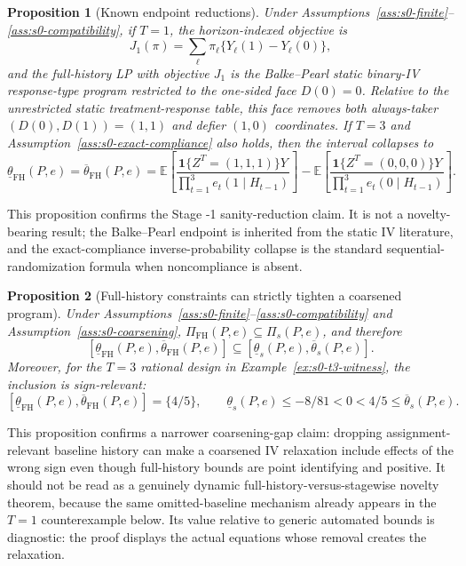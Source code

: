 \documentclass[11pt]{article}
\newcommand{\E}{\mathbb{E}}
\newcommand{\one}{\mathbf{1}}
\theoremstyle{definition}
\theoremstyle{plain}
\newtheorem{proposition}{Proposition}
\theoremstyle{remark}
\begin{document}
\begin{proposition}[Known endpoint reductions]\label{prop:s0-reductions}
Under Assumptions~\ref{ass:s0-finite}--\ref{ass:s0-compatibility}, if \(T=1\), the horizon-indexed objective is
\[
J_1(\pi)=\sum_{\ell}\pi_\ell\{Y_\ell(1)-Y_\ell(0)\},
\]
and the full-history LP with objective \(J_1\) is the Balke--Pearl static binary-IV response-type program restricted to the one-sided face \(D(0)=0\).  Relative to the unrestricted static treatment-response table, this face removes both always-taker \((D(0),D(1))=(1,1)\) and defier \((1,0)\) coordinates.  If \(T=3\) and Assumption~\ref{ass:s0-exact-compliance} also holds, then the interval collapses to
\[
\underline\theta_{\mathrm{FH}}(P,e)
=\overline\theta_{\mathrm{FH}}(P,e)
=
\E\left[
\frac{\one\{Z^T=(1,1,1)\}Y}
{\prod_{t=1}^3 e_t(1\mid H_{t-1})}
\right]
-
\E\left[
\frac{\one\{Z^T=(0,0,0)\}Y}
{\prod_{t=1}^3 e_t(0\mid H_{t-1})}
\right].
\]
\end{proposition}

This proposition confirms the Stage -1 sanity-reduction claim.  It is not a novelty-bearing result; the Balke--Pearl endpoint is inherited from the static IV literature, and the exact-compliance inverse-probability collapse is the standard sequential-randomization formula when noncompliance is absent.

\begin{proposition}[Full-history constraints can strictly tighten a coarsened program]\label{prop:s0-strict-witness}
Under Assumptions~\ref{ass:s0-finite}--\ref{ass:s0-compatibility} and Assumption~\ref{ass:s0-coarsening}, \(\Pi_{\mathrm{FH}}(P,e)\subseteq\Pi_s(P,e)\), and therefore
\[
[\underline\theta_{\mathrm{FH}}(P,e),\overline\theta_{\mathrm{FH}}(P,e)]
\subseteq
[\underline\theta_s(P,e),\overline\theta_s(P,e)].
\]
Moreover, for the \(T=3\) rational design in Example~\ref{ex:s0-t3-witness}, the inclusion is sign-relevant:
\[
[\underline\theta_{\mathrm{FH}}(P,e),\overline\theta_{\mathrm{FH}}(P,e)]
=\{4/5\},
\qquad
\underline\theta_s(P,e)\le -8/81<0<4/5\le\overline\theta_s(P,e).
\]
\end{proposition}

This proposition confirms a narrower coarsening-gap claim: dropping assignment-relevant baseline history can make a coarsened IV relaxation include effects of the wrong sign even though full-history bounds are point identifying and positive.  It should not be read as a genuinely dynamic full-history-versus-stagewise novelty theorem, because the same omitted-baseline mechanism already appears in the \(T=1\) counterexample below.  Its value relative to generic automated bounds is diagnostic: the proof displays the actual equations whose removal creates the relaxation.
\end{document}

